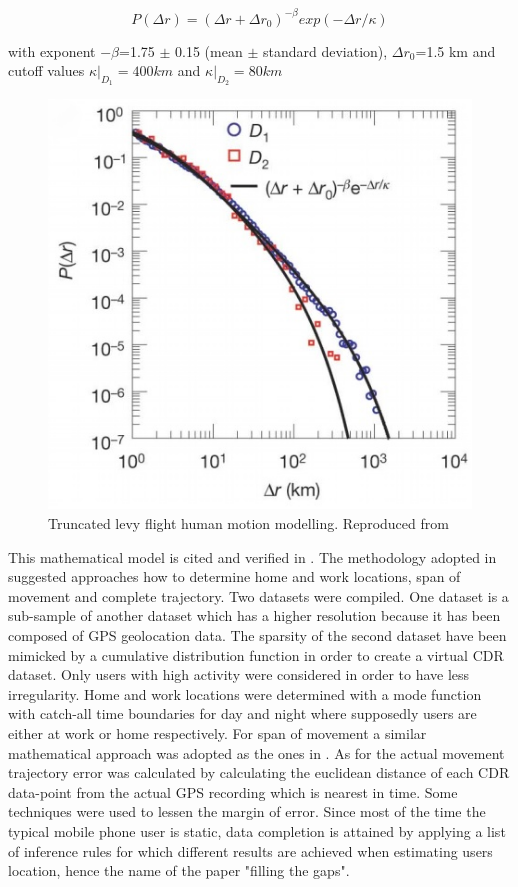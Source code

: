 \documentclass[12pt, a4paper]{report}
\theoremstyle{definition}
\theoremstyle{definition}%
\theoremstyle{definition}%
\theoremstyle{definition}%
\theoremstyle{definition}%
\theoremstyle{definition}%
\begin{document}
\begin{equation}\label{displacement_distribution}
P(\Delta r) = (\Delta r + \Delta r_{0})^{-\beta}  exp(-\Delta r/\kappa)
\end{equation} 

with exponent $-\beta$=1.75 $\pm$ 0.15 (mean $\pm$ standard deviation), $\Delta r_{0}$=1.5 km and cutoff values $\kappa|_{D_{1}}=400 km$ and $\kappa|_{D_{2}}=80 km$ 

\begin{figure}[h]	
	\includegraphics[scale=0.75]{truncated_power_law}
	\centering
	\caption[Truncated Levy Flight]{Truncated levy flight human motion modelling. Reproduced from \cite{Gonzalez2008}}
	\label{fig:levy_flight}
\end{figure}

This mathematical model is cited and verified in \cite{Calabrese2013}. The methodology adopted in \cite{Hoteit2016} suggested approaches how to determine home and work locations, span of movement and complete trajectory. Two datasets were compiled. One dataset is a sub-sample of another dataset which has a higher resolution because it has been composed of GPS geolocation data. The sparsity of the second dataset have been mimicked by a cumulative distribution function in order to create a virtual CDR dataset. Only users with high activity were considered in order to have less irregularity. Home and work locations were determined with a mode function with catch-all time boundaries for day and night where supposedly users are either at work or home respectively. For span of movement a similar mathematical approach was adopted as the ones in \cite{Hoteit2014,Gonzalez2008}. As for the actual movement trajectory error was calculated by calculating the euclidean distance of each CDR data-point from the actual GPS recording which is nearest in time.
Some techniques were used to lessen the margin of error. Since most of the time the typical mobile phone user is static, data completion is attained by applying a list of inference rules for which different results are achieved when estimating users location, hence the name of the paper "filling the gaps".
\end{document}
